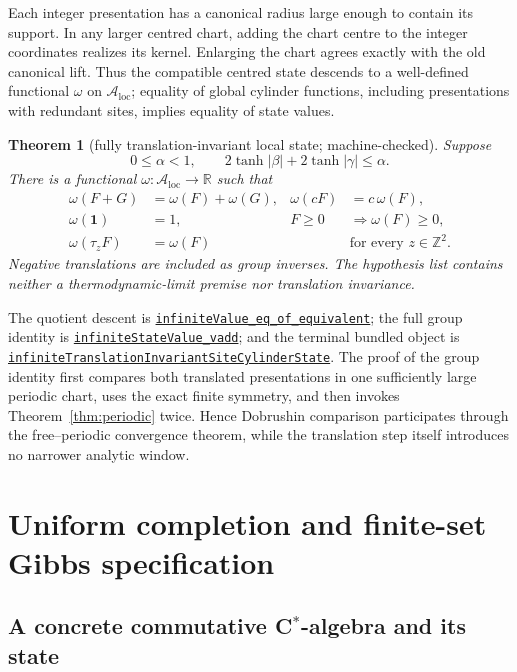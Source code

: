 \documentclass[11pt]{article}
\newtheorem{theorem}{Theorem}[section]
\theoremstyle{definition}
\newcommand{\R}{\mathbb R}
\newcommand{\Z}{\mathbb Z}
\newcommand{\one}{\mathbf 1}
\newcommand{\abs}[1]{\lvert #1\rvert}
\newcommand{\sourceanchor}{f587b35001f4ae87c7fe0383662864df6bc9a1c0}
\newcommand{\leanline}[3]{%
  \href{https://github.com/lluiseriksson/THE-ERIKSSON-PROGRAMME/blob/\sourceanchor/YangMills/OS/#1.lean\#L#2}{\nolinkurl{#3}}}
\begin{document}
Each integer presentation has a canonical radius large enough to contain its
support.  In any larger centred chart, adding the chart centre to the integer
coordinates realizes its kernel.  Enlarging the chart agrees exactly with the
old canonical lift.  Thus the compatible centred state descends to a
well-defined functional $\omega$ on $\mathcal A_{\mathrm{loc}}$; equality of
global cylinder functions, including presentations with redundant sites,
implies equality of state values.

\begin{theorem}[fully translation-invariant local state; machine-checked]
\label{thm:covariant-state}
Suppose
\[
  0\le\alpha<1,
  \qquad 2\tanh\abs\beta+2\tanh\abs\gamma\le\alpha.
\]
There is a functional $\omega:\mathcal A_{\mathrm{loc}}\to\R$ such that
\begin{align*}
  \omega(F+G)&=\omega(F)+\omega(G),&
  \omega(cF)&=c\,\omega(F),\\
  \omega(\one)&=1,&
  F\ge0&\Longrightarrow\omega(F)\ge0,\\
  \omega(\tau_zF)&=\omega(F)&&\text{for every }z\in\Z^2.
\end{align*}
Negative translations are included as group inverses.  The hypothesis list
contains neither a thermodynamic-limit premise nor translation invariance.
\end{theorem}

The quotient descent is
\leanline{DobrushinCovariantState}{40}{infiniteValue_eq_of_equivalent};
the full group identity is
\leanline{DobrushinCovariantState}{394}{infiniteStateValue_vadd};
and the terminal bundled object is
\leanline{DobrushinCovariantState}{496}{infiniteTranslationInvariantSiteCylinderState}.
The proof of the group identity first compares both translated presentations
in one sufficiently large periodic chart, uses the exact finite symmetry, and
then invokes Theorem~\ref{thm:periodic} twice.  Hence Dobrushin comparison
participates through the free--periodic convergence theorem, while the
translation step itself introduces no narrower analytic window.

\section{Uniform completion and finite-set Gibbs specification}
\label{sec:cstar-dlr}

\subsection{A concrete commutative C$^*$-algebra and its state}
\end{document}
